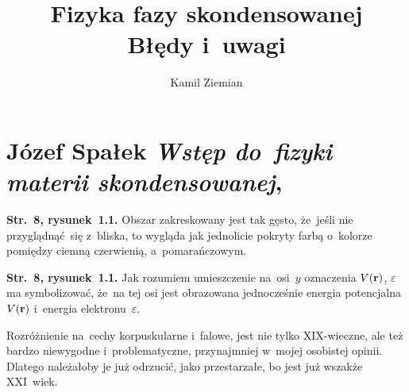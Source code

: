 \documentclass[a4paper,11pt]{article}
\title{Fizyka fazy skondensowanej \\
  {\Large Błędy i~uwagi}}
\author{Kamil Ziemian}
\numberwithin{equation}{section}
\begin{document}





\maketitle





\section{Józef Spałek \textit{Wstęp do~fizyki materii
    skondensowanej},
  \cite{SpalekWstepDoFizykiMateriiSkondensowanej2015}}

\VerSpaceTwo

\vspace{0em}



\vspace{0em}


\noindent
\textbf{Str.~8, rysunek~1.1.} Obszar zakreskowany jest tak gęsto,
że~jeśli nie przyglądnąć~się z~bliska, to wygląda jak jednolicie
pokryty farbą o~kolorze pomiędzy ciemną czerwienią, a~pomarańczowym.

\vspace{\spaceFour}





\noindent
\textbf{Str.~8, rysunek~1.1.} Jak rozumiem umieszczenie na~osi~$y$
oznaczenia $V( \mathbf{r} )$, $\varepsilon$ ma symbolizować, że~na tej osi jest
obrazowana jednocześnie energia potencjalna $V( \mathbf{r} )$ i~energia
elektronu~$\varepsilon$.

\vspace{\spaceFour}





\noindent
{} Rozróżnienie na~cechy korpuskularne i~falowe, jest nie tylko
XIX-wieczne, ale też bardzo niewygodne i~problematyczne, przynajmniej
w~mojej osobistej opinii. Dlatego należałoby je już odrzucić, jako
przestarzałe, bo jest już wszakże XXI~wiek.

\vspace{\spaceFour}
\end{document}
